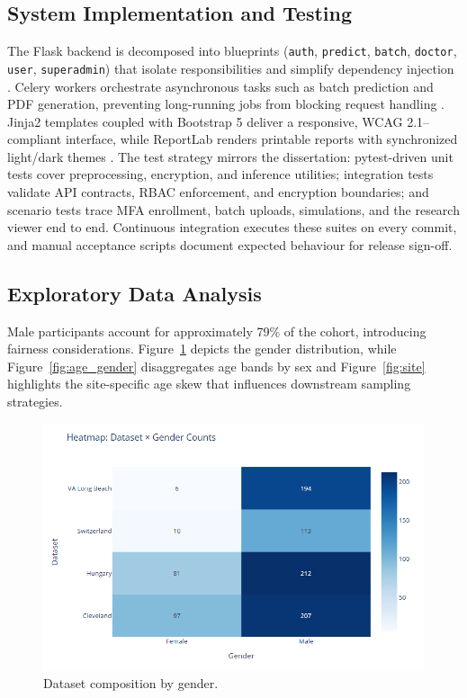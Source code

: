 \documentclass[conference]{IEEEtran}
\begin{document}
\subsection{System Implementation and Testing}
The Flask backend is decomposed into blueprints (\texttt{auth}, \texttt{predict}, \texttt{batch}, \texttt{doctor}, \texttt{user}, \texttt{superadmin}) that isolate responsibilities and simplify dependency injection \cite{grinberg2018flask}. Celery workers orchestrate asynchronous tasks such as batch prediction and PDF generation, preventing long-running jobs from blocking request handling \cite{celery}. Jinja2 templates coupled with Bootstrap 5 deliver a responsive, WCAG 2.1–compliant interface, while ReportLab renders printable reports with synchronized light/dark themes \cite{bootstrap5, reportlab, w3c_wcag21}. The test strategy mirrors the dissertation: pytest-driven unit tests cover preprocessing, encryption, and inference utilities; integration tests validate API contracts, RBAC enforcement, and encryption boundaries; and scenario tests trace MFA enrollment, batch uploads, simulations, and the research viewer end to end. Continuous integration executes these suites on every commit, and manual acceptance scripts document expected behaviour for release sign-off.

\subsection{Exploratory Data Analysis}
Male participants account for approximately 79\% of the cohort, introducing fairness considerations. Figure~\ref{fig:gender} depicts the gender distribution, while Figure~\ref{fig:age_gender} disaggregates age bands by sex and Figure~\ref{fig:site} highlights the site-specific age skew that influences downstream sampling strategies.

\begin{figure}[t]
  \centering
  \includegraphics[width=0.85\linewidth]{dataset_composition_by_gender.png}
  \caption{Dataset composition by gender.}
  \label{fig:gender}
\end{figure}
\end{document}

